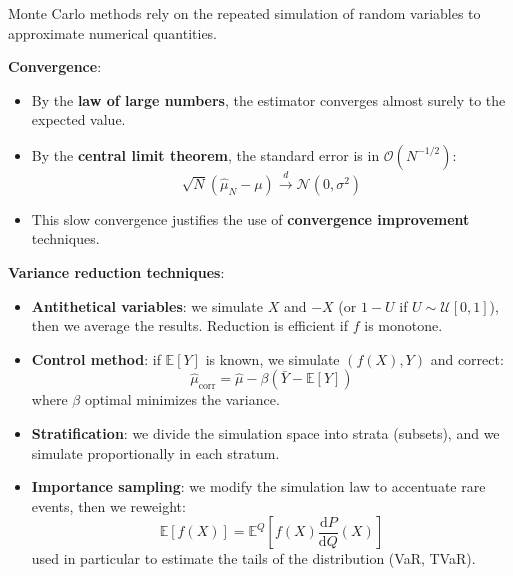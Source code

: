 \begin{f}

Monte Carlo methods rely on the repeated simulation of random variables to approximate numerical quantities.

\textbf{Convergence}:
\begin{itemize}[nosep]
	\item By the \textbf{law of large numbers}, the estimator converges almost surely to the expected value.
	\item By the \textbf{central limit theorem}, the standard error is in \(\mathcal{O}(N^{-1/2})\):
	\[
	\sqrt{N}(\hat{\mu}_N - \mu) \xrightarrow{d} \mathcal{N}(0, \sigma^2)
	\]
	\item This slow convergence justifies the use of \textbf{convergence improvement} techniques.
\end{itemize}

\textbf{Variance reduction techniques}:
\begin{itemize}
	\item \textbf{Antithetical variables}: we simulate \(X\) and \(-X\) (or \(1-U\) if \(U \sim \mathcal{U}[0,1]\)), then we average the results. Reduction is efficient if \(f\) is monotone.
	\item \textbf{Control method}: if \(\mathbb{E}[Y]\) is known, we simulate \((f(X), Y)\) and correct:
	\[
	\hat{\mu}_\text{corr} = \hat{\mu} - \beta(\bar{Y} - \mathbb{E}[Y])
	\]
	where \(\beta\) optimal minimizes the variance.
	\item \textbf{Stratification}: we divide the simulation space into strata (subsets), and we simulate proportionally in each stratum.
	\item \textbf{Importance sampling}: we modify the simulation law to accentuate rare events, then we reweight:
	\[
	\mathbb{E}[f(X)] = \mathbb{E}^{Q}\left[f(X) \frac{\mathrm{d}P}{\mathrm{d}Q}(X)\right]
	\]
	used in particular to estimate the tails of the distribution (VaR, TVaR).
\end{itemize}

\end{f}
